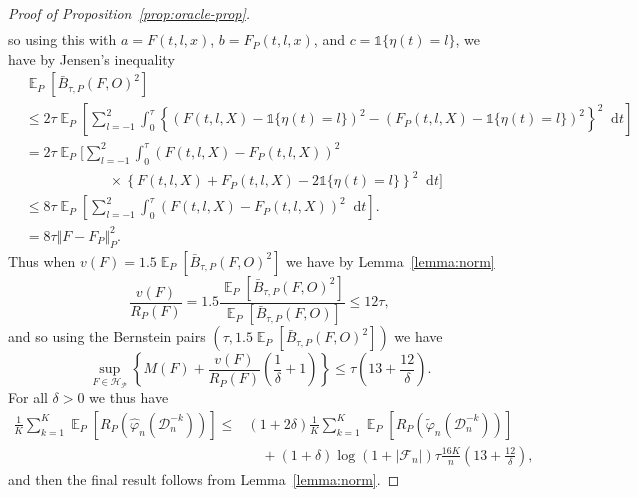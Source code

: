 \documentclass[lineno]{biometrika}
\DeclareMathOperator{\E}{\mathbb{E}} %
\renewcommand{\phi}{\varphi}
\newcommand*\diff{\mathop{}\!\mathrm{d}}
\newcommand{\1}{\mathds{1}}
\newcommand{\data}{\ensuremath{\mathcal{D}}}
\begin{document}
\begin{proof}[Proof of Proposition~\ref{prop:oracle-prop}]
\begin{align*}
\end{align*}
so using this with \( a=F(t, l, x) \), \( b=F_P(t, l, x) \), and
\( c = \1{\{\eta(t) = l\}} \), we have by Jensen's inequality
\begin{align*}
  & \E_P{[\bar{B}_{\tau,P}(F, O)^2]}
  \\
  & \leq
    2\tau\E_{P}{\left[
    \sum_{l=-1}^{2} \int_0^{\tau}
    \left\{
    \left(
    F(t, l, X) - \1{\{\eta(t) = l\}}
    \right)^2
    -
    \left(
    F_P(t, l, X) - \1{\{\eta(t) = l\}}
    \right)^2
    \right\}^2
    \diff t 
    \right]}
  \\
  & =2\tau
    \E_{P}\Bigg[
    \sum_{l=-1}^{2} \int_0^{\tau}
    \left(
    F(t, l, X) - F_P(t, l, X)
    \right)^2
  \\
  & \quad \quad \quad\quad \quad \quad \times
    \left\{
    F(t, l, X) +  F_P(t, l, X)-2 \1{\{\eta(t) = l\}}
    \right\}^2
    \diff t 
    \Bigg]
  \\
  & \leq
    8\tau \E_{P}{\left[
    \sum_{l=-1}^{2} \int_0^{\tau}
    \left(
    F(t, l, X) - F_P(t, l, X)
    \right)^2
    \diff t 
    \right]}.
  \\
  & =
    8\tau \Vert F - F_P \Vert_{P}^2.
\end{align*}
Thus when \( v(F) = 1.5 \E_P{[\bar{B}_{\tau,P}(F, O)^2]} \) we have by
Lemma~\ref{lemma:norm}
\begin{equation*}
  \frac{v(F)}{R_P(F)}
  = 1.5 \frac{\E_P{[\bar{B}_{\tau,P}(F, O)^2]}}{\E_P{[\bar{B}_{\tau,P}(F, O)]}}
  \leq 12 \tau,
\end{equation*}
and so using the Bernstein pairs \( (\tau, 1.5 \E_P{[\bar{B}_{\tau,P}(F, O)^2]}) \) we have
\begin{equation*}
  \sup_{F \in \mathcal{H}_{\mathcal{P}}}
  \left\{
    M(F) + \frac{v(F)}{R_P(F)}
    \left(
      \frac{1}{\delta} + 1
    \right)
  \right\}
  \leq \tau
  \left(
    13 + \frac{12}{\delta}
  \right).
\end{equation*}
For all $\delta>0$ we thus have
\begin{align*}
  \frac{1}{K} \sum_{k=1}^{K} \E_{P}{\left[ R_P(\hat{\phi}_n(\data_n^{-k})) \right]}
  \leq
  &(1+2\delta)\frac{1}{K} \sum_{k=1}^{K}\E_{P}{\left[ R_P(\tilde{\phi}_n(\data_n^{-k})) \right]}
  \\
  & \quad
    + (1+\delta)\log(1 + |\mathcal{F}_n|) \tau \frac{16 K}{n}
    \left(
    13 + \frac{12}{\delta}
    \right),
\end{align*}
and then the final result follows from Lemma~\ref{lemma:norm}.
\end{proof}
\end{document}
